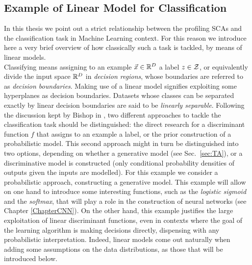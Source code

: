 \subsection{Example of Linear Model for Classification}\label{example:LDA}
In this thesis we point out a strict relationship between the profiling SCAs and the classification task in Machine Learning context. For this reason we introduce here a very brief overview of how classically such a task is tackled, by means of linear models. \\
Classifying means assigning to an example $\vec{x}\in\mathbb{R}^D$ a label $z\in \mathcal{Z}$, or equivalently divide the input space $\mathbb{R}^D$ in \emph{decision regions}, whose boundaries are referred to as \emph{decision boundaries}. Making use of a linear model signifies exploiting some hyperplanes as decision boundaries. Datasets whose classes can be separated exactly by linear decision boundaries are said to be \emph{linearly separable}. Following the discussion kept by Bishop in \cite{christopher2006pattern}, two different approaches to tackle the classification task should be distinguished: the direct research for a discriminant function $f$ that assigns to an example a label, or the prior construction of a probabilistic model. This second approach might in turn be distinguished into two options, depending on whether a generative model  (see Sec.~\ref{sec:TA}), or a discriminative model is constructed (\ie only conditional probability densities of outputs given the inputs are modelled). For this example we consider a probabilistic approach, constructing a generative model. This example will allow on one hand to introduce some interesting functions, such as the \emph{logistic sigmoid} and the \emph{softmax}, that will play a role in the construction of neural networks (see Chapter \ref{ChapterCNN}). On the other hand, this example justifies the large  exploitation of linear discriminant functions, even in contexts where the goal of the learning algorithm is making decisions directly, dispensing with any probabilistic interpretation. Indeed, linear models come out naturally when adding some assumptions on the data distributions, as those that will be introduced below. \\

